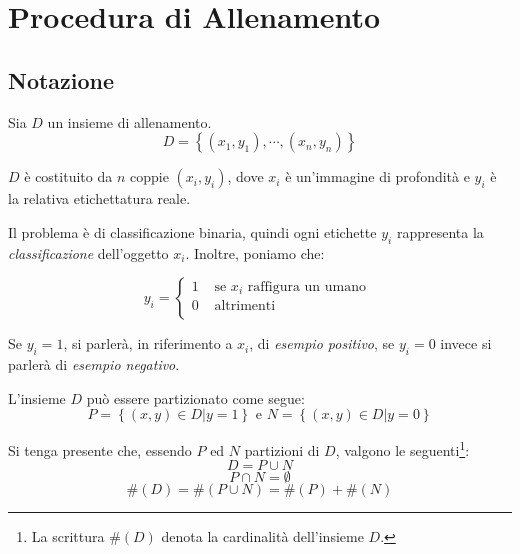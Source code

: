     \section{Procedura di Allenamento}
    \label{sec:training_procedure}
        \subsection{Notazione} %
        \label{sub:notazione}
            Sia $D$ un insieme di allenamento.
            \begin{equation}
                \label{subeq:training_set}
                D = \left\{(x_1, y_1), \cdots, (x_n, y_n)\right\}
            \end{equation}
            
            $D$ è costituito da $n$ coppie $(x_i, y_i)$, dove $x_i$ è un'immagine di profondità e $y_i$ è la relativa etichettatura reale.
     
            Il problema è di classificazione binaria, quindi ogni etichette $y_i$ rappresenta la \emph{classificazione} dell'oggetto $x_i$.
            Inoltre, poniamo che:

            \begin{equation}
                \label{eq:classification_notation}
                y_i =
                \begin{cases}
                    1 & \text{ se }x_i\text{ raffigura un umano }\\
                    0 & \text{ altrimenti }\\
                \end{cases}
            \end{equation}

            Se $y_i = 1$, si parlerà, in riferimento a $x_i$, di \emph{esempio positivo}, se $y_i = 0$ invece si parlerà di \emph{esempio negativo}.

            L'insieme $D$ può essere partizionato come segue:
            \begin{equation}
                \label{subeq:traininig_set_partitions}
                P = \left\{(x, y) \in D | y = 1\right\} 
                \text{ e } 
                N = \left\{(x,y) \in D | y = 0\right\}
            \end{equation}

            Si tenga presente che, essendo $P$ ed $N$ partizioni di $D$, valgono le seguenti\footnote{La scrittura $\#(D)$ denota la cardinalità dell'insieme $D$.}:
            \begin{equation}
                D = P \cup N
            \end{equation}
            \begin{equation}
                P \cap N = \emptyset
            \end{equation}
            \begin{equation}
                \#(D) = \#(P \cup N) = \#(P) + \#(N)
            \end{equation}

